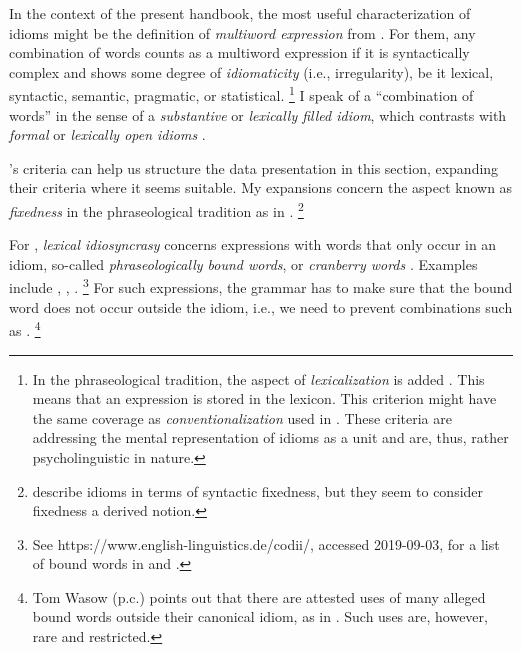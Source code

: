 \documentclass[output=paper
	        ,collection
	        ,collectionchapter
 	        ,biblatex
                ,babelshorthands
                ,newtxmath
                ,draftmode
                ,colorlinks, citecolor=brown
]{langscibook}
\begin{document}
In the context of the present handbook, the most useful characterization of idioms might be the definition of \emph{multiword expression} from  \citet{Baldwin:Kim:10}.
For them, any combination of words counts as a multiword expression if it is syntactically complex and shows some degree of \emph{idiomaticity} (i.e., irregularity), be it lexical, syntactic, semantic, pragmatic, or statistical.%
\footnote{In the phraseological tradition, the aspect of \emph{lexicalization} is added \citep{Fleischer97a-u,Burger:98}. This means that an expression is stored in the lexicon. This criterion might have the same coverage as \emph{conventionalization} used in \citet{NSW94a}. 
These criteria are addressing the mental representation of idioms as a unit and are, thus, rather psycholinguistic in nature.}
%
I speak of a ``combination of words'' in the sense of a \emph{substantive} or \emph{lexically filled idiom}, which 
contrasts with \emph{formal} or \emph{lexically open idioms} \citep[505]{FKoC88a}. 

\citeauthor{Baldwin:Kim:10}'s criteria can help us structure the data presentation in this section, expanding their criteria where it seems suitable.
My expansions concern the aspect known as \emph{fixedness} in the phraseological tradition as in \citet{Fleischer97a-u}.%
\footnote{\citet{Baldwin:Kim:10} describe idioms in terms of syntactic fixedness, but they seem to consider fixedness a derived notion.}


For \citet{Baldwin:Kim:10}, \emph{lexical idiosyncrasy} concerns expressions with words that only occur in an idiom, so-called \emph{phraseologically bound words}, or \emph{cranberry words} \citep{Aronoff76a-u}. Examples include , 
,
.%
\footnote{
See https://www.english-linguistics.de/codii/, accessed 2019-09-03, for a list of bound words in  and  \citep{Trawinski:al:08lrec}.}
For such expressions, the grammar has to make sure that the bound word does not occur outside the idiom, i.e., we need to prevent combinations such as .%
\footnote{Tom Wasow (p.c.) points out that there are attested uses of many alleged bound words outside their canonical idiom, as in . Such uses are, however, rare and restricted.
\z 

}
\end{document}
